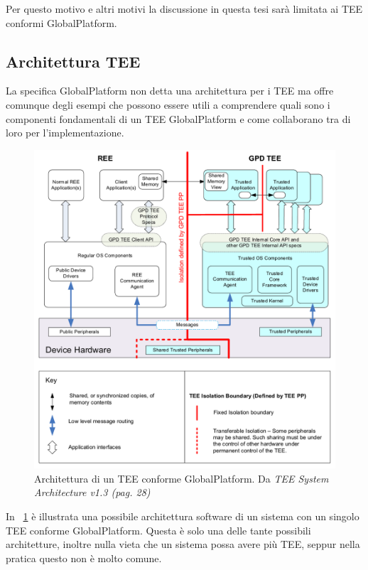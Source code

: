 \documentclass[12pt,italian]{report}
\begin{document}
Per questo motivo e altri motivi la discussione in questa tesi sarà limitata
ai TEE conformi GlobalPlatform.

\subsection{Architettura TEE}
\label{subsec:architettura-tee}

La specifica GlobalPlatform non detta una architettura per i TEE ma offre
comunque degli esempi che possono essere utili a comprendere quali sono
i componenti fondamentali di un TEE GlobalPlatform e come collaborano
tra di loro per l'implementazione.

\begin{figure}
    \centering
    \includegraphics[width=1\textwidth]{immagini/tee-system-architecture}
    \caption{
        Architettura di un TEE conforme GlobalPlatform. 
        Da \textit{TEE System Architecture v1.3 (pag. 28)}
        \cite{gp2020systemarchitecture}
    }
    \label{fig:tee-system-architecture}
\end{figure}

In \figurename~\ref{fig:tee-system-architecture} è illustrata una possibile
architettura software di un sistema con un singolo TEE conforme
GlobalPlatform. Questa è solo una delle tante possibili architetture, inoltre
nulla vieta che un sistema possa avere più TEE, seppur nella pratica
questo non è molto comune.
\end{document}
